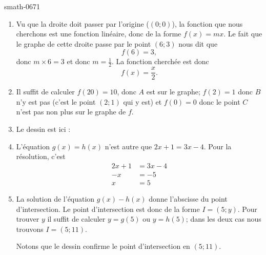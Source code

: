 
\begin{corrige}{smath-0671}

    \begin{enumerate}
        \item
            Vu que la droite doit passer par l'origine (\( (0;0)\)), la fonction que nous cherchons est une fonction linéaire, donc de la forme \( f(x)=mx\). Le fait que le graphe de cette droite passe par le point \( (6;3)\) nous dit que
            \begin{equation}
                f(6)=3,
            \end{equation}
            donc \( m\times 6=3\) et donc \( m=\frac{ 1 }{2}\). La fonction cherchée est donc
            \begin{equation}
                f(x)=\frac{ x }{2}.
            \end{equation}
        \item
            Il suffit de calculer \( f(20)=10\), donc \( A\) est sur le graphe; \( f(2)=1\) donc \( B\) n'y est pas (c'est le point \( (2;1)\) qui y est) et \( f(0)=0\) donc le point \( C\) n'est pas non plus sur le graphe de \( f\).
        \item
            Le dessin est ici :
            \begin{center}
   
            \end{center}
        \item
            L'équation \( g(x)=h(x)\) n'est autre que \( 2x+1=3x-4\). Pour la résolution, c'est 
            \begin{subequations}
                \begin{align}
                    2x+1&=3x-4\\
                    -x&=-5\\
                    x&=5
                \end{align}
            \end{subequations}
        \item
            La solution de l'équation \( g(x)-h(x)\) donne l'abscisse du point d'intersection. Le point d'intersection est donc de la forme \( I=(5;y)\). Pour trouver \( y\) il suffit de calculer \( y=g(5)\) ou \( y=h(5)\); dans les deux cas nous trouvons \( I=(5;11)\).

            Notons que le dessin confirme le point d'intersection en  \( (5;11)\).
    \end{enumerate}

\end{corrige}

